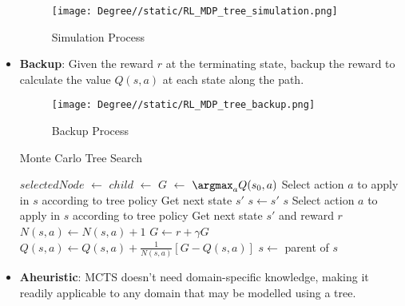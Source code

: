 \documentclass[a4paper]{article}
\begin{document}
\begin{itemize}
    \begin{figure}[H]
        \centering
        \texttt{[image: Degree//static/RL\_MDP\_tree\_simulation.png]}
        \caption{Simulation Process}
    \end{figure}
    \item \textbf{Backup}: Given the reward $r$ at the terminating state, backup the reward to calculate the value $Q(s,a)$ at each state along the path.
    \begin{figure}[H]
        \centering
        \texttt{[image: Degree//static/RL\_MDP\_tree\_backup.png]}
        \caption{Backup Process}
    \end{figure}
    \begin{algorithm}[H]
        \caption{Monte Carlo Tree Search}
        \begin{algorithmic}[1]
                    \State $selectedNode$ $\gets$ 
                    \State $child$ $\gets$ 
                    \State $G$ $\gets$ 
                    \State {}
                \EndWhile
                \State \Return $\argmax_aQ(s_0,a)$
            \EndFunction
            \Statex
                    \State Select action $a$ to apply in $s$ according to tree policy
                    \State Get next state $s'$
                    \State $s\gets s'$
                \EndWhile
                \State \Return $s$
            \EndFunction
            \Statex
                \State Select action $a$ to apply in $s$ according to tree policy
                \State Get next state $s'$ and reward $r$
            \EndFunction
            \Statex
                \Repeat
                    \State $N(s,a)\gets N(s,a)+1$
                    \State $G\gets r+\gamma G$
                    \State $Q(s,a)\gets Q(s,a)+\frac{1}{N(s,a)}[G-Q(s,a)]$
                    \State $s\gets$ parent of $s$
            \EndFunction
        \end{algorithmic}
    \end{algorithm}
    \item \textbf{Aheuristic}: MCTS doesn't need domain-specific knowledge, making it readily applicable to any domain that may be modelled using a tree.

\end{itemize}
\end{document}
